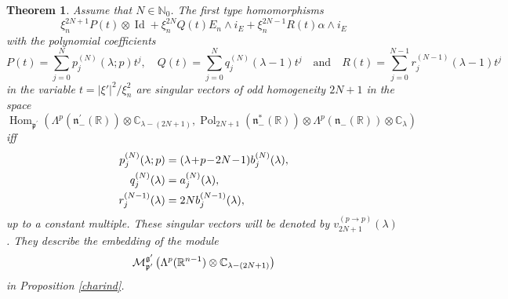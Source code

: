 \documentclass[a4paper,12pt,reqno]{amsart}
\newtheorem{theorem}{Theorem}
\numberwithin{theorem}{subsection}
\numberwithin{equation}{section}
\begin{document}
\begin{theorem}\label{OddFromPtoP} Assume that $N \in {\mathbb{N}}_0$. The first type
homomorphisms
\begin{equation*}
   \xi_n^{2N+1} P(t) \otimes {\operatorname{Id}} + \xi_n^{2N} Q(t) E_n \wedge i_E + \xi_n^{2N-1} R(t) \alpha \wedge i_E
\end{equation*}
with the polynomial coefficients
$$
   P(t) = \sum_{j=0}^N p^{(N)}_j(\lambda;p) t^j, \quad
   Q(t) = \sum_{j=0}^N q^{(N)}_j(\lambda\!-\!1) t^j \quad \mbox{and} \quad
   R(t) = \sum_{j=0}^{N-1} r^{(N-1)}_j(\lambda\!-\!1)t^j
$$
in the variable $t = {\lvert{\xi'}\rvert}^2/\xi_n^2$ are singular vectors of odd
homogeneity $2N+1$ in the space
$$
   {\operatorname{Hom}}_{{{\mathfrak p}}^\prime}(\Lambda^p ({{\mathfrak n}}_-^\prime({\mathbb{R}})) \otimes {\mathbb{C}}_{\lambda-(2N+1)},
   {\operatorname{Pol}}_{2N+1}({{\mathfrak n}}_-^*({\mathbb{R}})) \otimes \Lambda^p ({{\mathfrak n}}_-({\mathbb{R}})) \otimes {\mathbb{C}}_\lambda)
$$
iff
\begin{align*}
   p_j^{(N)}(\lambda;p) & = (\lambda\!+\!p\!-\!2N\!-\!1) b_j^{(N)}(\lambda), \notag \\
   q_j^{(N)}(\lambda) & = a_j^{(N)}(\lambda), \notag \\
   r_j^{(N-1)}(\lambda) & = 2N b_j^{(N-1)}(\lambda),
\end{align*}
up to a constant multiple. These singular vectors will be denoted by
$v_{2N+1}^{(p\to p)}(\lambda)$. They describe the embedding of the module
$$
   {\fam2 M}^{{{\mathfrak g}}^\prime}_{{{\mathfrak p}}^\prime} \left(\Lambda^{p}({\mathbb{R}}^{n-1}) \otimes {\mathbb{C}}_{\lambda-(2N+1)}\right)
$$
in Proposition \ref{charind}.
\end{theorem}
\end{document}

